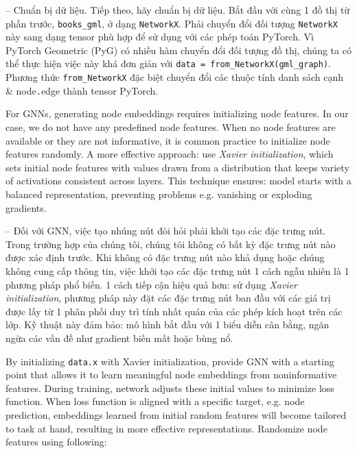 \documentclass{article}
\begin{document}
\begin{itemize}
\begin{itemize}
\begin{itemize}
\begin{itemize}
               -- {\sf Chuẩn bị dữ liệu.} Tiếp theo, hãy chuẩn bị dữ liệu. Bắt đầu với cùng 1 đồ thị từ phần trước, \verb|books_gml|, ở dạng {\tt NetworkX}. Phải chuyển đổi đối tượng {\tt NetworkX} này sang dạng tensor phù hợp để sử dụng với các phép toán PyTorch. Vì PyTorch Geometric (PyG) có nhiều hàm chuyển đổi đối tượng đồ thị, chúng ta có thể thực hiện việc này khá đơn giản với \verb|data = from_NetworkX(gml_graph)|. Phương thức \verb|from_NetworkX| đặc biệt chuyển đổi các thuộc tính danh sách cạnh \& node{\tt.}edge thành tensor PyTorch.

               For GNNs, generating node embeddings requires initializing node features. In our case, we do not have any predefined node features. When no node features are available or they are not informative, it is common practice to initialize node features randomly. A more effective approach: use {\it Xavier initialization}, which sets initial node features with values drawn from a distribution that keeps variety of activations consistent across layers. This technique ensures: model starts with a balanced representation, preventing problems e.g. vanishing or exploding gradients.

               -- Đối với GNN, việc tạo nhúng nút đòi hỏi phải khởi tạo các đặc trưng nút. Trong trường hợp của chúng tôi, chúng tôi không có bất kỳ đặc trưng nút nào được xác định trước. Khi không có đặc trưng nút nào khả dụng hoặc chúng không cung cấp thông tin, việc khởi tạo các đặc trưng nút 1 cách ngẫu nhiên là 1 phương pháp phổ biến. 1 cách tiếp cận hiệu quả hơn: sử dụng {\it Xavier initialization}, phương pháp này đặt các đặc trưng nút ban đầu với các giá trị được lấy từ 1 phân phối duy trì tính nhất quán của các phép kích hoạt trên các lớp. Kỹ thuật này đảm bảo: mô hình bắt đầu với 1 biểu diễn cân bằng, ngăn ngừa các vấn đề như gradient biến mất hoặc bùng nổ.

               By initializing {\tt data.x} with Xavier initialization, provide GNN with a starting point that allows it to learn meaningful node embeddings from noninformative features. During training, network adjusts these initial values to minimize loss function. When loss function is aligned with a specific target, e.g. node prediction, embeddings learned from initial random features will become tailored to task at hand, resulting in more effective representations. Randomize node features using following:


\end{itemize}
\end{itemize}
\end{itemize}
\end{itemize}
\end{document}
